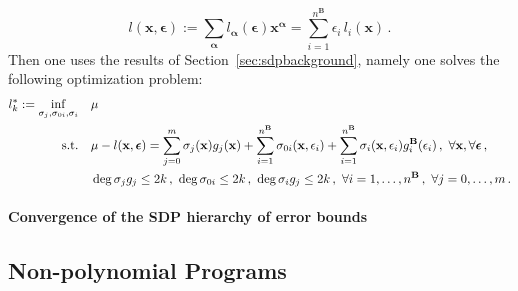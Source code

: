 \documentclass[a4paper,10pt]{article}
\newcommand{\x}{\mathbf{x}}
\newcommand{\alphab}{\boldsymbol{\alpha}}
\newcommand{\epsilonb}{\boldsymbol{\epsilon}}
\def\B{\mathbf{B}}
\theoremstyle{plain}
\theoremstyle{definition}
\theoremstyle{remark}
\begin{document}
\[ 
l(\x,\epsilonb):= \sum_{\alphab} l_{\alphab}(\epsilonb) \x^{\alphab} = \sum_{i=1}^{n^\B} \epsilon_i \, l_i(\x) \,.
\]
Then one uses the results of Section~\ref{sec:sdpbackground}, namely one solves the following optimization problem:
%
\begin{align}
\label{eq:primalexists}
l^*_k := \inf\limits_{\sigma_j, \sigma_{0 i}, \sigma_{i}} \quad & \mu \\			
\text{s.t.} \quad & \mu - l(\x, \epsilonb) = 
\sum_{j=0}^m \sigma_j(\x) g_j(\x) + 
\sum_{i=1}^{n^{\B}}\sigma_{0 i}(\x,\epsilon_i) +  \sum_{i=1}^{n^{\B}}\sigma_i(\x,\epsilon_i) g_i^{\B}(\epsilon_i)  \,, \
\forall \x, \forall \epsilonb \,, \notag\\
\quad & 
\deg \sigma_j g_j \leq 2 k \,, \ 
\deg \sigma_{0 i} \leq 2 k \,, \ 
\deg \sigma_i g_j \leq 2 k \,, \ 
\forall i = 1,\dots,n^{\B} \,, \ 
\forall j = 0,\dots,m \,. \notag
\end{align}

\paragraph{Convergence of the SDP hierarchy of error bounds}

\subsection{Non-polynomial Programs}
\end{document}

